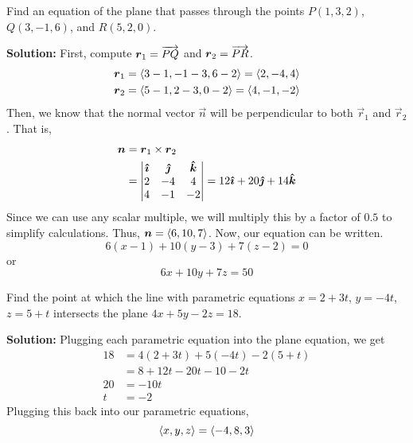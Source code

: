 \begin{example}
    Find an equation of the plane that passes through the points \(P(1,3,2)\), \(Q(3,-1,6)\), and \(R(5,2,0)\).\par \textbf{Solution:} First, compute \(\boldsymbol{r}_1 = \overrightarrow{PQ}\) and \(\boldsymbol{r}_2 = \overrightarrow{PR}\).
    \begin{align*}
        \boldsymbol{r}_1 &= \left\langle3-1, -1-3, 6-2\right\rangle = \left\langle2,-4, 4\right\rangle \\
        \boldsymbol{r}_2 &= \left\langle5-1, 2-3, 0-2\right\rangle = \left\langle4, -1, -2\right\rangle
    \end{align*}
    Then, we know that the normal vector \(\vec n\) will be perpendicular to both \(\vec r_1\) and \(\vec r_2\). That is,
    \begin{align*}
        \boldsymbol{n} &= \boldsymbol{r}_1 \times \boldsymbol{r}_2 \\
        &= \begin{vmatrix}
            \boldsymbol{\hat{\imath}} & \boldsymbol{\hat{\jmath}} & \boldsymbol{\hat{k}} \\
            2 & -4 & 4 \\
            4 & -1 & -2
        \end{vmatrix} = 12\boldsymbol{\hat{\imath}} + 20\boldsymbol{\hat{\jmath}} + 14\boldsymbol{\hat{k}}
    \end{align*}
    Since we can use any scalar multiple, we will multiply this by a factor of \(0.5\) to simplify calculations. Thus, \(\boldsymbol{n} = \left\langle6, 10, 7\right\rangle\). Now, our equation can be written.
    \[6(x-1)+10(y-3)+7(z-2)=0\]
    or
    \[6x+10y+7z=50\]
\end{example}
\begin{example}
    Find the point at which the line with parametric equations \(x=2+3t\), \(y=-4t\), \(z=5+t\) intersects the plane \(4x+5y-2z=18\).\par\textbf{Solution:} Plugging each parametric equation into the plane equation, we get
    \begin{align*}
        18 &= 4(2+3t)+5(-4t)-2(5+t) \\
        &= 8+12t-20t-10-2t \\
        20 &= -10t \\
        t &= -2
    \end{align*}
    Plugging this back into our parametric equations,
    \[\left\langle x,y,z\right\rangle = \left\langle-4, 8, 3\right\rangle\]
\end{example}

